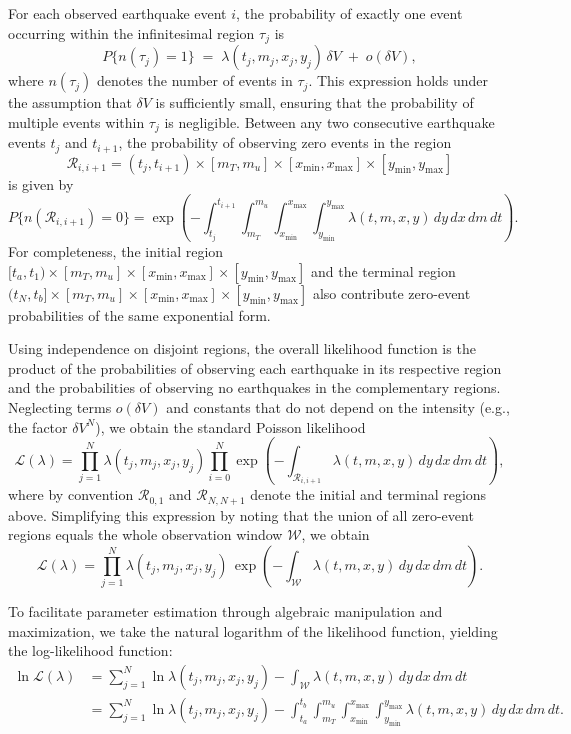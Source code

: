 \documentclass[linenum,doublespace,onecolumn]{SSA-SRL}
\theoremstyle{lemma}
\begin{document}
For each observed earthquake event \( i \), the probability of exactly one event occurring within the infinitesimal region \( \tau_j \) is
\[
P\{n(\tau_j) = 1\} \;=\; \lambda(t_j, m_j, x_j, y_j)\,\delta V \;+\; o(\delta V),
\]
where \( n(\tau_j) \) denotes the number of events in \( \tau_j \). This expression holds under the assumption that \( \delta V \) is sufficiently small, ensuring that the probability of multiple events within \( \tau_j \) is negligible. Between any two consecutive earthquake events \( t_j \) and \( t_{i+1} \), the probability of observing zero events in the region
\[
\mathcal{R}_{i,i+1} = (t_j, t_{i+1}) \times [m_T, m_u] \times [x_{\text{min}}, x_{\text{max}}] \times [y_{\text{min}}, y_{\text{max}}]
\]
is given by
\[
P\{n(\mathcal{R}_{i,i+1}) = 0\} = \exp\left(-\int_{t_j}^{t_{i+1}} \int_{m_T}^{m_u} \int_{x_{\text{min}}}^{x_{\text{max}}} \int_{y_{\text{min}}}^{y_{\text{max}}} \lambda(t, m, x, y) \, dy \, dx \, dm \, dt\right).
\]
For completeness, the initial region \( [t_a,t_1) \times [m_T,m_u] \times [x_{\min},x_{\max}] \times [y_{\min},y_{\max}] \) and the terminal region \( (t_N,t_b] \times [m_T,m_u] \times [x_{\min},x_{\max}] \times [y_{\min},y_{\max}] \) also contribute zero-event probabilities of the same exponential form.

Using independence on disjoint regions, the overall likelihood function is the product of the probabilities of observing each earthquake in its respective region and the probabilities of observing no earthquakes in the complementary regions. Neglecting terms \(o(\delta V)\) and constants that do not depend on the intensity (e.g., the factor \(\delta V^N\)), we obtain the standard Poisson likelihood
\[
\mathcal{L}(\lambda) = \prod_{j=1}^N  \lambda(t_j, m_j, x_j, y_j) \prod_{i=0}^{N} \exp\left(-\int_{\mathcal{R}_{i,i+1}} \lambda(t, m, x, y) \, dy \, dx \, dm \, dt\right),
\]
where by convention \(\mathcal{R}_{0,1}\) and \(\mathcal{R}_{N,N+1}\) denote the initial and terminal regions above. Simplifying this expression by noting that the union of all zero-event regions equals the whole observation window \( \mathcal{W} \), we obtain
\[
\mathcal{L}(\lambda) = \prod_{j=1}^N \lambda(t_j, m_j, x_j, y_j) \,\exp\left(-\int_{\mathcal{W}} \lambda(t, m, x, y) \, dy \, dx \, dm \, dt\right).
\]

To facilitate parameter estimation through algebraic manipulation and maximization, we take the natural logarithm of the likelihood function, yielding the log-likelihood function:
\begin{align*}
\ln \mathcal{L}(\lambda) &=  \sum_{j=1}^N \ln \lambda(t_j, m_j, x_j, y_j) - \int_{\mathcal{W}} \lambda(t, m, x, y) \, dy \, dx \, dm \, dt\\
& = \sum_{j=1}^N \ln \lambda(t_j, m_j, x_j, y_j) - \int_{t_a}^{t_b} \int_{m_T}^{m_u} \int_{x_{\text{min}}}^{x_{\text{max}}} \int_{y_{\text{min}}}^{y_{\text{max}}} \lambda(t, m, x, y) \, dy \, dx \, dm \, dt.
\end{align*}
\end{document}
